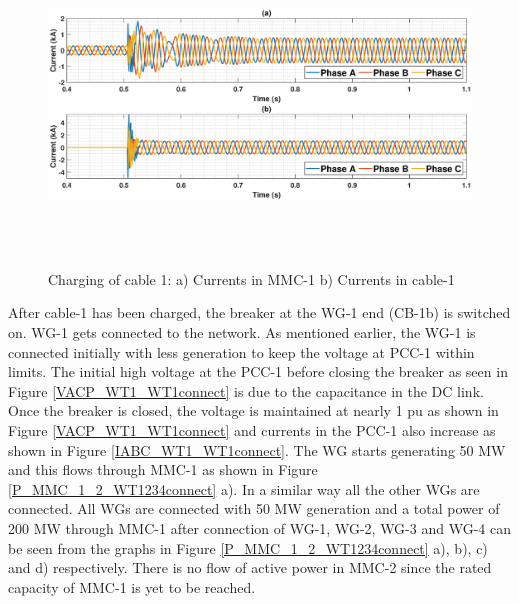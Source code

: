 \begin{figure}[H]
\centering
    \includegraphics[height = 8.5cm,width = 16.5cm]{Diagrams/Chapter_5/IABC_MMC_1_Cab1_Cab1charg.eps}
    \caption{Charging of cable 1: a) Currents in MMC-1 b) Currents in cable-1}
    \label{IABC_MMC_1_Cab1_Cab1charg}
\end{figure}

After cable-1 has been charged, the breaker at the \gls{WG}-1 end (CB-1b) is switched on. \gls{WG}-1 gets connected to the network. As mentioned earlier, the \gls{WG}-1 is connected initially with less generation to keep the voltage at \gls{PCC}-1 within limits. The initial high voltage at the \gls{PCC}-1 before closing the breaker as seen in Figure \ref{VACP_WT1_WT1connect} is due to the capacitance in the DC link. Once the breaker is closed, the voltage is maintained at nearly 1 pu as shown in Figure \ref{VACP_WT1_WT1connect} and currents in the \gls{PCC}-1 also increase as shown in Figure \ref{IABC_WT1_WT1connect}. The \gls{WG} starts generating 50 MW and this flows through \gls{MMC}-1 as shown in Figure \ref{P_MMC_1_2_WT1234connect} a). In a similar way all the other \gls{WG}s are connected. All \gls{WG}s are connected with 50 MW generation and a total power of 200 MW through \gls{MMC}-1 after connection of \gls{WG}-1, \gls{WG}-2, \gls{WG}-3 and \gls{WG}-4 can be seen from the graphs in Figure \ref{P_MMC_1_2_WT1234connect} a), b), c) and d) respectively. There is no flow of active power in \gls{MMC}-2 since the rated capacity of \gls{MMC}-1 is yet to be reached.

